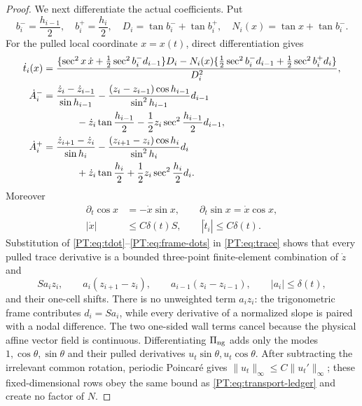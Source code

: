 \documentclass[11pt]{amsart}
\numberwithin{equation}{section}
\theoremstyle{definition}
\theoremstyle{remark}
\newcommand{\PiNG}{\Pi_{\rm ng}}
\begin{document}
\begin{proof}
We next differentiate the actual coefficients.  Put
\[
 b_i^- =\frac{h_{i-1}}2,\quad b_i^+=\frac{h_i}2,\quad
 D_i=\tan b_i^-+\tan b_i^+,\quad
 N_i(x)=\tan x+\tan b_i^-.
\]
For the pulled local coordinate $x=x(t)$, direct differentiation gives
\begin{align}
 \dot t_i(x)
 &=\frac{\{\sec^2x\,\dot x+\tfrac12\sec^2b_i^-d_{i-1}\}D_i
       -N_i(x)\{\tfrac12\sec^2b_i^-d_{i-1}
                  +\tfrac12\sec^2b_i^+d_i\}}
       {D_i^2},\label{PT:eq:tdot}\\
 \dot A_i^-
 &=\frac{\dot z_i-\dot z_{i-1}}{\sin h_{i-1}}
   -\frac{(z_i-z_{i-1})\cos h_{i-1}}{\sin^2h_{i-1}}d_{i-1}\\
 &\hspace{12mm}-\dot z_i\tan\frac{h_{i-1}}2
   -\frac12z_i\sec^2\frac{h_{i-1}}2d_{i-1},
 \label{PT:eq:Adot-minus}\\
 \dot A_i^+
 &=\frac{\dot z_{i+1}-\dot z_i}{\sin h_i}
   -\frac{(z_{i+1}-z_i)\cos h_i}{\sin^2h_i}d_i\\
 &\hspace{12mm}+\dot z_i\tan\frac{h_i}2
   +\frac12z_i\sec^2\frac{h_i}2d_i.
 \label{PT:eq:Adot-plus}
\end{align}
Moreover
\begin{align}
 \partial_t\cos x&=-\dot x\sin x,\qquad
 \partial_t\sin x=\dot x\cos x,\label{PT:eq:frame-dots}\\
 |\dot x|&\le C\delta(t)S,\qquad
 |\dot t_i|\le C\delta(t).
\end{align}
Substitution of \eqref{PT:eq:tdot}--\eqref{PT:eq:frame-dots} in
\eqref{PT:eq:trace} shows that every pulled trace derivative is a bounded
three-point finite-element combination of $\dot z$ and
\begin{equation}\label{PT:eq:transport-ledger}
 S a_i z_i,\qquad
 a_i(z_{i+1}-z_i),\qquad
 a_{i-1}(z_i-z_{i-1}),
 \qquad |a_i|\le\delta(t),
\end{equation}
and their one-cell shifts.  There is no unweighted term $a_i z_i$: the
trigonometric frame contributes $d_i=S a_i$, while every derivative of a
normalized slope is paired with a nodal difference.  The two one-sided
wall terms cancel because the physical affine vector field is continuous.
Differentiating $\PiNG$ adds only the modes $1,\cos\theta,\sin\theta$ and
their pulled derivatives $u_t\sin\theta,u_t\cos\theta$.  After subtracting
the irrelevant common rotation, periodic Poincar\'e gives
$\|u_t\|_\infty\le C\|u_t'\|_\infty$; these fixed-dimensional rows obey
the same bound as \eqref{PT:eq:transport-ledger} and create no factor of $N$.


\end{proof}
\end{document}
